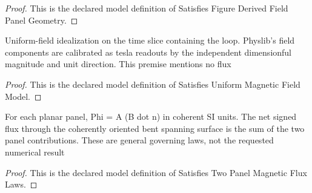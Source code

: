 \begin{proof}
  This is the declared model definition of Satisfies Figure Derived Field Panel Geometry.
\end{proof}
\begin{definition}
  \label{def:physics:phyx-mini-0929:phyxminiproblems-problemphyxmini0929-satisfiesuniformmagneticfieldmodel}
  Uniform-field idealization on the time slice containing the loop. Physlib's field components are calibrated as tesla readouts by the independent dimensionful magnitude and unit direction. This premise mentions no flux
\end{definition}
\begin{proof}
  This is the declared model definition of Satisfies Uniform Magnetic Field Model.
\end{proof}
\begin{definition}
  \label{def:physics:phyx-mini-0929:phyxminiproblems-problemphyxmini0929-satisfiestwopanelmagneticfluxlaws}
  For each planar panel, Phi = A (B dot n) in coherent SI units. The net signed flux through the coherently oriented bent spanning surface is the sum of the two panel contributions. These are general governing laws, not the requested numerical result
\end{definition}
\begin{proof}
  This is the declared model definition of Satisfies Two Panel Magnetic Flux Laws.
\end{proof}
